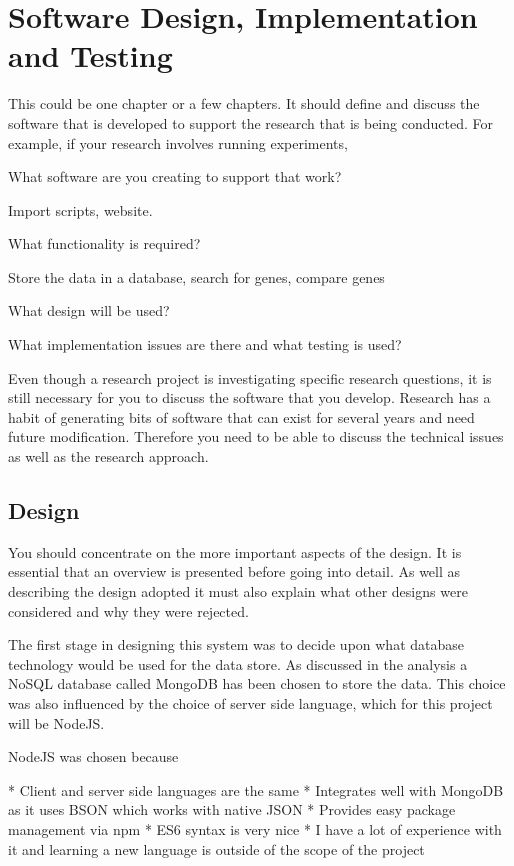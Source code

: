 \chapter{Software Design, Implementation and Testing}

This could be one chapter or a few chapters. It should define and discuss the software that is developed to support the research that is being conducted. For example, if your research involves running experiments, 

What software are you creating to support that work?

Import scripts, website. 

What functionality is required?

Store the data in a database, search for genes, compare genes

What design will be used?

What implementation issues are there and what testing is used? 

Even though a research project is investigating specific research questions, it is still necessary for you to discuss the software that you develop. Research has a habit of generating bits of software that can exist for several years and need future modification. Therefore you need to be able to discuss the technical issues as well as the research approach. 

\section{Design}
You should concentrate on the more important aspects of the design. It is essential that an overview is presented before going into detail. As well as describing the design adopted it must also explain what other designs were considered and why they were rejected.

The first stage in designing this system was to decide upon what database technology would be used for the data store. As discussed in the analysis a NoSQL database called MongoDB has been chosen to store the data. This choice was also influenced by the choice of server side language, which for this project will be NodeJS. 

NodeJS was chosen because 

* Client and server side languages are the same
* Integrates well with MongoDB as it uses BSON which works with native JSON
* Provides easy package management via npm
* ES6 syntax is very nice
* I have a lot of experience with it and learning a new language is outside of the scope of the project

